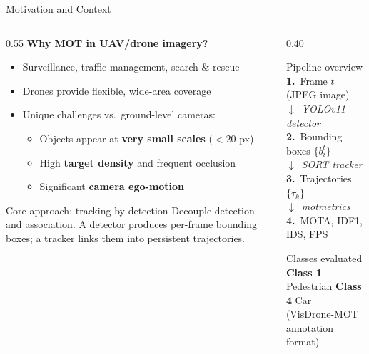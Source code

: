\documentclass[aspectratio=169]{beamer}
\begin{document}
\begin{frame}{Motivation and Context}
  \begin{columns}[T]
    \begin{column}{0.55\textwidth}
      \textbf{Why MOT in UAV/drone imagery?}
      \begin{itemize}
        \item Surveillance, traffic management, search \& rescue
        \item Drones provide flexible, wide-area coverage
        \item Unique challenges vs.\ ground-level cameras:
              \begin{itemize}
                \item Objects appear at \textbf{very small scales} ($<20$ px)
                \item High \textbf{target density} and frequent occlusion
                \item Significant \textbf{camera ego-motion}
              \end{itemize}
      \end{itemize}
      \vspace{0.4em}
      \begin{alertblock}{Core approach: tracking-by-detection}
        \small Decouple detection and association.
        A detector produces per-frame bounding boxes;
        a tracker links them into persistent trajectories.
      \end{alertblock}
    \end{column}
    \begin{column}{0.40\textwidth}
      \begin{block}{Pipeline overview}
        \small
        \textbf{1.}~Frame $t$ (JPEG image)\\
        $\downarrow$~\textit{YOLOv11 detector}\\
        \textbf{2.}~Bounding boxes $\{b_i^t\}$\\
        $\downarrow$~\textit{SORT tracker}\\
        \textbf{3.}~Trajectories $\{\tau_k\}$\\
        $\downarrow$~\textit{motmetrics}\\
        \textbf{4.}~MOTA, IDF1, IDS, FPS
      \end{block}
      \vspace{0.3em}
      \begin{block}{Classes evaluated}
        \small
        \textbf{Class 1} Pedestrian \quad
        \textbf{Class 4} Car\\
        {\footnotesize(VisDrone-MOT annotation format)}
      \end{block}
    \end{column}
  \end{columns}
\end{frame}
\end{document}
